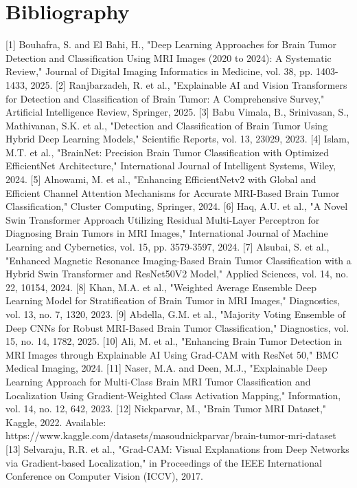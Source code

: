 \documentclass[12pt,a4paper,oneside]{report}
\begin{document}
\chapter*{Bibliography}
[1] Bouhafra, S. and El Bahi, H., "Deep Learning Approaches for Brain Tumor Detection and Classification Using MRI Images (2020 to 2024): A Systematic Review," Journal of Digital Imaging Informatics in Medicine, vol. 38, pp. 1403-1433, 2025.
[2] Ranjbarzadeh, R. et al., "Explainable AI and Vision Transformers for Detection and Classification of Brain Tumor: A Comprehensive Survey," Artificial Intelligence Review, Springer, 2025.
[3] Babu Vimala, B., Srinivasan, S., Mathivanan, S.K. et al., "Detection and Classification of Brain Tumor Using Hybrid Deep Learning Models," Scientific Reports, vol. 13, 23029, 2023.
[4] Islam, M.T. et al., "BrainNet: Precision Brain Tumor Classification with Optimized EfficientNet Architecture," International Journal of Intelligent Systems, Wiley, 2024.
[5] Alnowami, M. et al., "Enhancing EfficientNetv2 with Global and Efficient Channel Attention Mechanisms for Accurate MRI-Based Brain Tumor Classification," Cluster Computing, Springer, 2024.
[6] Haq, A.U. et al., "A Novel Swin Transformer Approach Utilizing Residual Multi-Layer Perceptron for Diagnosing Brain Tumors in MRI Images," International Journal of Machine Learning and Cybernetics, vol. 15, pp. 3579-3597, 2024.
[7] Alsubai, S. et al., "Enhanced Magnetic Resonance Imaging-Based Brain Tumor Classification with a Hybrid Swin Transformer and ResNet50V2 Model," Applied Sciences, vol. 14, no. 22, 10154, 2024.
[8] Khan, M.A. et al., "Weighted Average Ensemble Deep Learning Model for Stratification of Brain Tumor in MRI Images," Diagnostics, vol. 13, no. 7, 1320, 2023.
[9] Abdella, G.M. et al., "Majority Voting Ensemble of Deep CNNs for Robust MRI-Based Brain Tumor Classification," Diagnostics, vol. 15, no. 14, 1782, 2025.
[10] Ali, M. et al., "Enhancing Brain Tumor Detection in MRI Images through Explainable AI Using Grad-CAM with ResNet 50," BMC Medical Imaging, 2024.
[11] Naser, M.A. and Deen, M.J., "Explainable Deep Learning Approach for Multi-Class Brain MRI Tumor Classification and Localization Using Gradient-Weighted Class Activation Mapping," Information, vol. 14, no. 12, 642, 2023.
[12] Nickparvar, M., "Brain Tumor MRI Dataset," Kaggle, 2022. Available: https://www.kaggle.com/datasets/masoudnickparvar/brain-tumor-mri-dataset
[13] Selvaraju, R.R. et al., "Grad-CAM: Visual Explanations from Deep Networks via Gradient-based Localization," in Proceedings of the IEEE International Conference on Computer Vision (ICCV), 2017.
\end{document}
